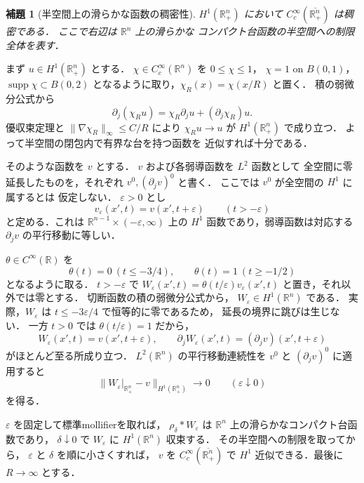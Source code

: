 \documentclass[a5paper,10pt,onecolumn]{jsarticle}
\makeatletter
\theoremstyle{mathnotetheorem}
\newtheorem{lemma}[theorem]{補題}
\renewcommand{\proofname}{証明}
\renewenvironment{proof}[1][\proofname]{%
  \par\pushQED{\qed}\normalfont\topsep4\p@\@plus2\p@\relax
  \trivlist\item[\hskip\labelsep\bfseries #1]\ignorespaces
}{\popQED\endtrivlist\@endpefalse}
\newcommand{\norm}[1]{\lVert #1\rVert}
\makeatother
\begin{document}
\begin{lemma}[半空間上の滑らかな函数の稠密性]
\label{lem:halfspace-density}
$H^1(\mathbb R^n_+)$ において
$C_c^\infty(\overline{\mathbb R^n_+})$ は稠密である．
ここで右辺は $\mathbb R^n$ 上の滑らかな
コンパクト台函数の半空間への制限全体を表す．
\end{lemma}
\begin{proof}
まず $u\in H^1(\mathbb R^n_+)$ とする．
$\chi\in C_c^\infty(\mathbb R^n)$ を
$0\le\chi\le1$，
$\chi=1$ on $B(0,1)$，
$\operatorname{supp}\chi\subset B(0,2)$
となるように取り，$\chi_R(x)=\chi(x/R)$ と置く．
積の弱微分公式から
\[
 \partial_j(\chi_Ru)
 =\chi_R\partial_ju+(\partial_j\chi_R)u .
\]
優収束定理と
$\norm{\nabla\chi_R}_\infty\le C/R$ により
$\chi_Ru\to u$ が $H^1(\mathbb R^n_+)$ で成り立つ．
よって半空間の閉包内で有界な台を持つ函数を
近似すれば十分である．

そのような函数を $v$ とする．
$v$ および各弱導函数を $L^2$ 函数として
全空間に零延長したものを，それぞれ
$v^0,(\partial_jv)^0$ と書く．
ここでは $v^0$ が全空間の $H^1$ に属するとは
仮定しない．
$\varepsilon>0$ とし
\[
 v_\varepsilon(x',t)=v(x',t+\varepsilon)
 \qquad(t>-\varepsilon)
\]
と定める．これは
$\mathbb R^{n-1}\times(-\varepsilon,\infty)$ 上の
$H^1$ 函数であり，弱導函数は対応する
$\partial_jv$ の平行移動に等しい．

$\theta\in C^\infty(\mathbb R)$ を
\[
 \theta(t)=0\ (t\le-3/4),\qquad
 \theta(t)=1\ (t\ge-1/2)
\]
となるように取る．
$t>-\varepsilon$ で
$W_\varepsilon(x',t)=\theta(t/\varepsilon)
 v_\varepsilon(x',t)$ と置き，それ以外では零とする．
切断函数の積の弱微分公式から，
$W_\varepsilon\in H^1(\mathbb R^n)$ である．
実際，$W_\varepsilon$ は
$t\le-3\varepsilon/4$ で恒等的に零であるため，
延長の境界に跳びは生じない．
一方 $t>0$ では $\theta(t/\varepsilon)=1$ だから，
\[
 W_\varepsilon(x',t)=v(x',t+\varepsilon),\qquad
 \partial_jW_\varepsilon(x',t)
 =(\partial_jv)(x',t+\varepsilon)
\]
がほとんど至る所成り立つ．
$L^2(\mathbb R^n)$ の平行移動連続性を
$v^0$ と $(\partial_jv)^0$ に適用すると
\[
 \norm{W_\varepsilon|_{\mathbb R^n_+}-v}
       _{H^1(\mathbb R^n_+)}
 \longrightarrow0
 \qquad(\varepsilon\downarrow0)
\]
を得る．

$\varepsilon$ を固定して標準mollifierを取れば，
$\rho_\delta*W_\varepsilon$ は
$\mathbb R^n$ 上の滑らかなコンパクト台函数であり，
$\delta\downarrow0$ で $W_\varepsilon$ に
$H^1(\mathbb R^n)$ 収束する．
その半空間への制限を取ってから，
$\varepsilon$ と $\delta$ を順に小さくすれば，
$v$ を $C_c^\infty(\overline{\mathbb R^n_+})$ で
$H^1$ 近似できる．最後に $R\to\infty$ とする．
\end{proof}
\end{document}
